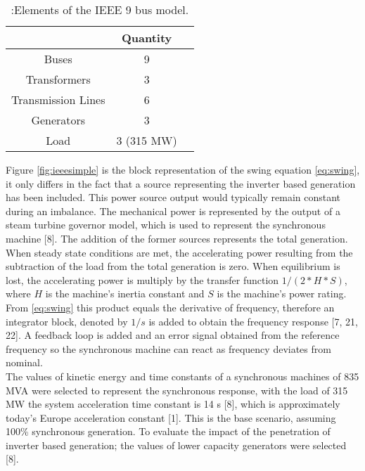 \begin{table}[h]
	\caption{\label{tb:gridelements}:Elements of the IEEE 9 bus model.}
	\centering
	\begin{tabular}{ccc}
		\toprule
		\textbf{}	& \textbf{Quantity}\\
		\midrule
		Buses		& 9			\\
		Transformers		& 3			\\
 		Transmission Lines			& 6 \\
		Generators			& 3 \\
 		Load			& 3 (315 MW)  \\
		\bottomrule
	\end{tabular}
\end{table}





Figure \ref{fig:ieeesimple} is the block representation of the swing equation \eqref{eq:swing}, it only differs in the fact that a source representing the inverter based generation has been included. This power source output would typically remain constant during an imbalance. The mechanical power is represented by the output of a steam turbine governor model, which is used to represent the synchronous machine [8]. The addition of the former sources represents the total generation. When steady state conditions are met, the accelerating power resulting from the subtraction of the load from the total generation is zero. When equilibrium is lost, the accelerating power is multiply by the transfer function $ 1/(2*H*S) $, where $ H $ is the machine’s inertia constant and $ S $ is the machine’s power rating. From \ref{eq:swing} this product equals the derivative of frequency, therefore an integrator block, denoted by $ 1/s $ is added to obtain the frequency response [7, 21, 22]. A feedback loop is added and an error signal obtained from the reference frequency so the synchronous machine can react as frequency deviates from nominal. \\ %
The values of kinetic energy and time constants of a synchronous machines of 835 MVA were selected to represent the synchronous response, with the load of 315 MW the system acceleration time constant is 14 s [8], which is approximately today’s Europe acceleration constant [1]. This is the base scenario, assuming 100\% synchronous generation. To evaluate the impact of the penetration of inverter based generation; the values of lower capacity generators were selected [8].%


